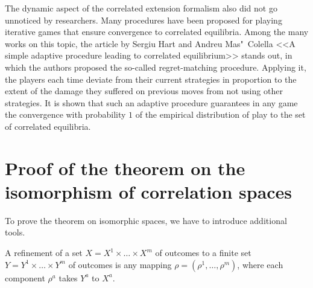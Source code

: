 The dynamic aspect of the correlated extension formalism also did not go unnoticed by researchers. Many procedures have been proposed for playing iterative games that ensure convergence to correlated equilibria. Among the many works on this topic, the article by Sergiu Hart and Andreu Mas"~Colella <<A simple adaptive procedure leading to correlated equilibrium>> \cite{Hart} stands out, in which the authors proposed the so-called regret-matching procedure. Applying it, the players each time deviate from their current strategies in proportion to the extent of the damage they suffered on previous moves from not using other strategies. It is shown that such an adaptive procedure guarantees in any game the convergence with probability $1$ of the empirical distribution of play to the set of correlated equilibria. %

\chapter{Proof of the theorem on the isomorphism of correlation spaces}\label{app:B}

To prove the theorem on isomorphic spaces, we have to introduce additional tools. %

\begin{definition}
	A refinement of a set $X = X^1 \times \ldots \times X^m$ of outcomes to a finite set $Y = Y^1 \times \ldots \times Y^m$ of outcomes is any mapping $\rho = (\rho^1, \ldots, \rho^m)$, where each component $\rho^a$ takes $Y^a$ to $X^a$. %
\end{definition}

